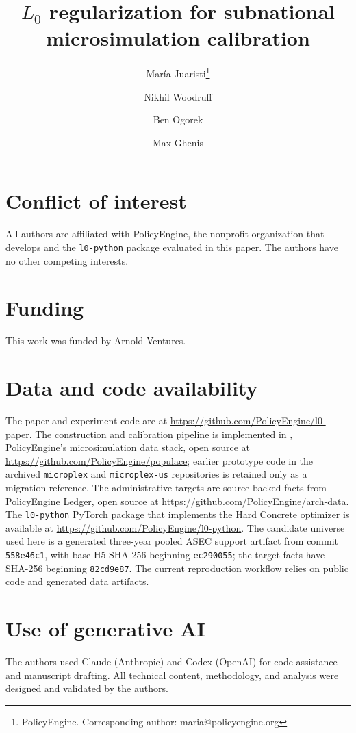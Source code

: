 \documentclass[11pt]{article}
\title{$L_0$ regularization for subnational microsimulation calibration}
\author{
    María Juaristi\thanks{PolicyEngine. Corresponding author: maria@policyengine.org} \and
    Nikhil Woodruff\footnotemark[1] \and
    Ben Ogorek\footnotemark[1] \and
    Max Ghenis\footnotemark[1]
}
\date{}
\begin{document}
\maketitle











\section*{Conflict of interest}
All authors are affiliated with PolicyEngine, the nonprofit organization that develops \populace{} and
the \texttt{l0-python} package evaluated in this paper. The authors have no other competing interests.

\section*{Funding}
This work was funded by Arnold Ventures.

\section*{Data and code availability}
The paper and experiment code are at \url{https://github.com/PolicyEngine/l0-paper}. The construction
and calibration pipeline is implemented in \populace{}, PolicyEngine's microsimulation data stack,
open source at \url{https://github.com/PolicyEngine/populace}; earlier prototype code in the archived
\texttt{microplex} and \texttt{microplex-us} repositories is retained only as a migration reference.
The administrative targets are source-backed facts from PolicyEngine Ledger, open source at
\url{https://github.com/PolicyEngine/arch-data}.
The \texttt{l0-python} PyTorch package that implements the Hard Concrete optimizer is available at
\url{https://github.com/PolicyEngine/l0-python}. The candidate universe used here is a generated
three-year pooled ASEC support artifact from \populace{} commit \texttt{558e46c1}, with base H5 SHA-256
beginning \texttt{ec290055}; the target facts have SHA-256 beginning \texttt{82cd9e87}. The current
reproduction workflow relies on public code and generated data artifacts.

\section*{Use of generative AI}
The authors used Claude (Anthropic) and Codex (OpenAI) for code assistance and manuscript drafting. All technical
content, methodology, and analysis were designed and validated by the authors.





\end{document}
